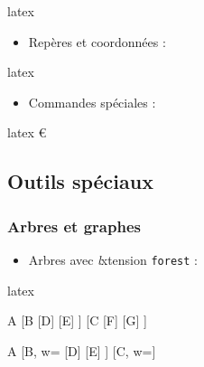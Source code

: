 \documentclass[
    french,
    margin=2cm
]{neoschool}
\begin{document}
\begin{code}{latex}
\end{code}

\begin{itemize}
\item Repères et coordonnées :
\end{itemize}

\begin{code}{latex}
\Oij             %
\Oijk            %
\Ouv             %
\end{code}

\begin{itemize}
\item Commandes spéciales :
\end{itemize}

\begin{code}{latex}
\euro            %
\cg              %
\cd              %
\pg              %
\pp              %
\ds              %
\end{code}

\subsection{Outils spéciaux}

\subsubsection{Arbres et graphes}

\begin{itemize}
\item
  Arbres avec \emph{l}xtension \texttt{forest} :
\end{itemize}

\begin{code}{latex}
\begin{neotree}
A
    [B
        [D]
        [E]
    ]
    [C
        [F]
        [G]
    ]
\end{neotree}

\begin{neotree}
A
    [B, w=
        [D]
        [E]
    ]
    [C, w=]
\end{neotree}
\end{code}
\end{document}

